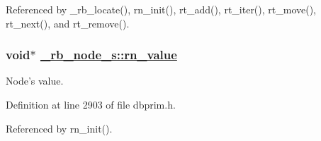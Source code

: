 Referenced by \_\-rb\_\-locate(), rn\_\-init(), rt\_\-add(), rt\_\-iter(), rt\_\-move(), rt\_\-next(), and rt\_\-remove().\hypertarget{struct__rb__node__s_o7}{
\subsubsection[rn\_\-value]{\setlength{\rightskip}{0pt plus 5cm}void$\ast$ \hyperlink{struct__rb__node__s_o7}{\_\-rb\_\-node\_\-s::rn\_\-value}}}
\label{struct__rb__node__s_o7}


Node's value. 

Definition at line 2903 of file dbprim.h.

Referenced by rn\_\-init().
